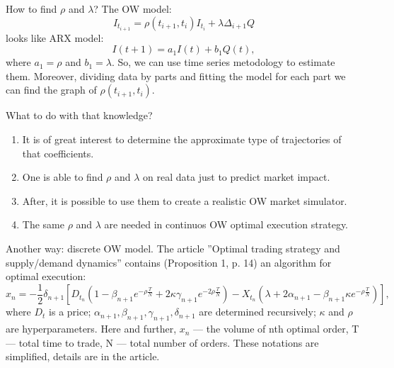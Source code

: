 \documentclass[aspectratio=169]{beamer}
\begin{document}
\begin{frame}{How to find $\rho$ and $\lambda$?}
    The OW model:
    \begin{equation}
        I_{t_{i+1}} = \rho (t_{i + 1}, t_i) I_{t_i} + \lambda \Delta_{i + 1} Q
    \end{equation}
    looks like ARX model:
    \begin{equation*}
        I(t + 1) = a_1 I(t) + b_1 Q(t),
    \end{equation*}
    where $a_1 = \rho$ and $b_1 = \lambda$. So, we can use time series metodology to estimate them.
    Moreover, dividing data by parts and fitting the model for each part we can find the graph of $\rho (t_{i + 1}, t_i)$.
\end{frame}

\begin{frame}{What to do with that knowledge?}
    \begin{enumerate}
        \item It is of great interest to determine the approximate type of trajectories of that coefficients.
        \item One is able to find $\rho$ and $\lambda$ on real data just to predict market impact.
        \item After, it is possible to use them to create a realistic OW market simulator.
        \item The same $\rho$ and $\lambda$ are needed in continuos OW optimal execution strategy. 
    \end{enumerate}
\end{frame}

\begin{frame}{Another way: discrete OW model.}
    The article ''Optimal trading strategy and supply/demand dynamics'' contains (Proposition 1, p. 14) 
    an algorithm for optimal execution:
    \begin{equation*}
        x_n = - \frac{1}{2} \delta_{n + 1} [D_{t_n} (1 - \beta_{n + 1} e^{ - \rho \frac{T}{N}} + 2 \kappa \gamma_{n+1} e^{ - 2 \rho \frac{T}{N}}) 
        - X_{t_n} (\lambda + 2 \alpha_{n+1} - \beta_{n+1}\kappa e^{ - \rho \frac{T}{N}}) ], 
    \end{equation*}
    where $D_t$ is a price; $\alpha_{n+1}, \beta_{n+1}, \gamma_{n+1}, \delta_{n + 1}$ are determined recursively; $\kappa$ and $\rho$ 
    are hyperparameters. Here and further, $x_n$ --- the volume of nth optimal order, T --- total time to trade, N --- total number of
    orders. These notations are simplified, details are in the article. 
\end{frame}
\end{document}
